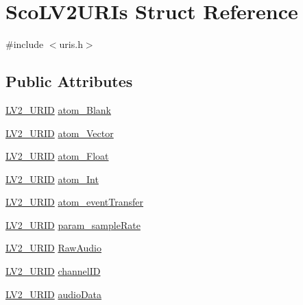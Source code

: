 \hypertarget{struct_sco_l_v2_u_r_is}{}\section{Sco\+L\+V2\+U\+R\+Is Struct Reference}
\label{struct_sco_l_v2_u_r_is}


{\ttfamily \#include $<$uris.\+h$>$}

\subsection*{Public Attributes}
\begin{DoxyCompactItemize}
\item 
\hyperlink{urid_8h_a5ff0630d245539e9f6dca10ff3c40fae}{L\+V2\+\_\+\+U\+R\+ID} \hyperlink{struct_sco_l_v2_u_r_is_a29ecb9082898099bbc59fcb7590bea7a}{atom\+\_\+\+Blank}
\item 
\hyperlink{urid_8h_a5ff0630d245539e9f6dca10ff3c40fae}{L\+V2\+\_\+\+U\+R\+ID} \hyperlink{struct_sco_l_v2_u_r_is_ad24847b1e2792340b987409e8fa3bba4}{atom\+\_\+\+Vector}
\item 
\hyperlink{urid_8h_a5ff0630d245539e9f6dca10ff3c40fae}{L\+V2\+\_\+\+U\+R\+ID} \hyperlink{struct_sco_l_v2_u_r_is_ae2503e43c71746a7b76e58868b7b5984}{atom\+\_\+\+Float}
\item 
\hyperlink{urid_8h_a5ff0630d245539e9f6dca10ff3c40fae}{L\+V2\+\_\+\+U\+R\+ID} \hyperlink{struct_sco_l_v2_u_r_is_a273b116e5e97062888483d276a1d446a}{atom\+\_\+\+Int}
\item 
\hyperlink{urid_8h_a5ff0630d245539e9f6dca10ff3c40fae}{L\+V2\+\_\+\+U\+R\+ID} \hyperlink{struct_sco_l_v2_u_r_is_a84139547f83842b3c46d72b519f631d5}{atom\+\_\+event\+Transfer}
\item 
\hyperlink{urid_8h_a5ff0630d245539e9f6dca10ff3c40fae}{L\+V2\+\_\+\+U\+R\+ID} \hyperlink{struct_sco_l_v2_u_r_is_ad0afcbe26a6aa7d624a154ae8d69185f}{param\+\_\+sample\+Rate}
\item 
\hyperlink{urid_8h_a5ff0630d245539e9f6dca10ff3c40fae}{L\+V2\+\_\+\+U\+R\+ID} \hyperlink{struct_sco_l_v2_u_r_is_a0e65908eca6f7180605f1c08b9d454f2}{Raw\+Audio}
\item 
\hyperlink{urid_8h_a5ff0630d245539e9f6dca10ff3c40fae}{L\+V2\+\_\+\+U\+R\+ID} \hyperlink{struct_sco_l_v2_u_r_is_a8fdb5e6fa5d15656a600f0fff8e2210c}{channel\+ID}
\item 
\hyperlink{urid_8h_a5ff0630d245539e9f6dca10ff3c40fae}{L\+V2\+\_\+\+U\+R\+ID} \hyperlink{struct_sco_l_v2_u_r_is_aec22f4691d90b0f0ed9f21c98db51bd2}{audio\+Data}

\end{DoxyCompactItemize}
